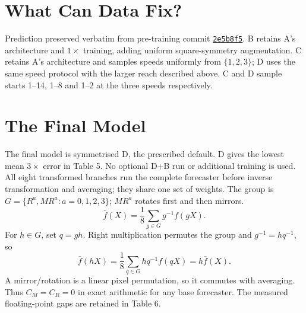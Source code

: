 \section{What Can Data Fix?}
{\small\color{muted}Prediction preserved verbatim from pre-training commit \href{https://github.com/MuhammadBinTariq/DL4STG-PA2/commit/2e5b8f5866a2de7c84ae2ed73e1f58e150513758}{\texttt{2e5b8f5}}.}
B retains A's architecture and $1\times$ training, adding uniform square-symmetry augmentation. C retains A's architecture and samples speeds uniformly from $\{1,2,3\}$; D uses the same speed protocol with the larger reach described above. C and D sample starts 1--14, 1--8 and 1--2 at the three speeds respectively.

\clearpage
{}
\section{The Final Model}
The final model is symmetrised D, the prescribed default. D gives the lowest mean $3\times$ error in Table 5. No optional D+B run or additional training is used. All eight transformed branches run the complete forecaster before inverse transformation and averaging; they share one set of weights.
The group is $G=\{R^a,MR^a:a=0,1,2,3\}$; $MR^a$ rotates first and then mirrors.
\[
\bar f(X)=\frac18\sum_{g\in G}g^{-1}f(gX).
\]
For $h\in G$, set $q=gh$. Right multiplication permutes the group and $g^{-1}=h q^{-1}$, so
\[
\bar f(hX)=\frac18\sum_{q\in G}h q^{-1}f(qX)=h\bar f(X).
\]
A mirror/rotation is a linear pixel permutation, so it commutes with averaging. Thus $C_M=C_R=0$ in exact arithmetic for any base forecaster. The measured floating-point gaps are retained in Table 6.
\clearpage

\clearpage

